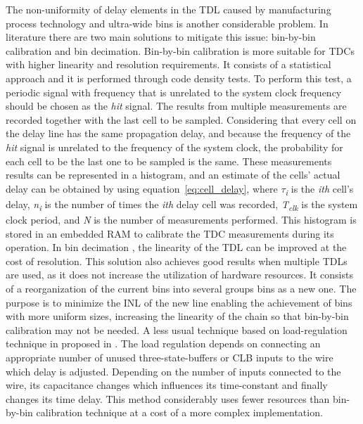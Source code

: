 The non-uniformity of delay elements in the \gls{TDL} caused by manufacturing process technology and ultra-wide bins is another considerable problem. In literature there are two main solutions to mitigate this issue: bin-by-bin calibration and bin decimation. Bin-by-bin calibration \citep{bin_by_bin_calibration} is more suitable for \glspl{TDC} with higher linearity and resolution requirements. It consists of a statistical approach and it is performed through code density tests. To perform this test, a periodic signal with frequency that is unrelated to the system clock frequency should be chosen as the \textit{hit} signal. The results from multiple measurements are recorded together with the last cell to be sampled. Considering that every cell on the delay line has the same propagation delay, and because the frequency of the \textit{hit} signal is unrelated to the frequency of the system clock, the probability for each cell to be the last one to be sampled is the same. These measurements results can be represented in a histogram, and an estimate of the cells’ actual delay can be obtained by using equation~\ref{eq:cell_delay}, where $\tau$\textit{\textsubscript{i}} is the \textit{ith} cell’s delay, \textit{n\textsubscript{i}} is the number of times the \textit{ith} delay cell was recorded, \textit{T\textsubscript{clk}} is the system clock period, and \textit{N} is the number of measurements performed. This histogram is stored in an embedded \gls{RAM} to calibrate the \gls{TDC} measurements during its operation. In bin decimation \citep{bin_decimation}, the linearity of the \gls{TDL} can be improved at the cost of resolution. This solution also achieves good results when multiple \glspl{TDL} are used, as it does not increase the utilization of hardware resources. It consists of a reorganization of the current bins into several groups bins as a new one. The purpose is to minimize the \gls{INL} of the new line enabling the achievement of bins with more uniform sizes, increasing the linearity of the chain so that bin-by-bin calibration may not be needed. A less usual technique based on load-regulation technique in proposed in \citep{hw_linearization}. The load regulation depends on connecting an appropriate number of unused three-state-buffers or \gls{CLB} inputs to the wire which delay is adjusted. Depending on the number of inputs connected to the wire, its capacitance changes which influences its time-constant and finally changes its time delay. This method considerably uses fewer resources than bin-by-bin calibration technique at a cost of a more complex implementation.

